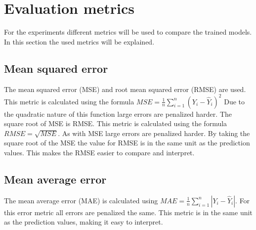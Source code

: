 \documentclass[class=scrbook, crop=false]{standalone}
\begin{document}




\section{Evaluation metrics}
\label{Section:Evaluation_Metrics}

For the experiments different metrics will be used to compare the trained models. 
In this section the used metrics will be explained.

\subsection{Mean squared error}

The mean squared error (MSE) and root mean squared error (RMSE) are used.
This metric is calculated using the formula $MSE = \frac{1}{n} \sum_{i=1}^{n}(Y_i - \hat{Y}_i)^2$
Due to the quadratic nature of this function large errors are penalized harder.
The square root of MSE is RMSE. 
This metric is calculated using the formula $RMSE = \sqrt{MSE}$.
As with MSE large errors are penalized harder.
By taking the square root of the MSE the value for RMSE is in the same unit as the prediction values. 
This makes the RMSE easier to compare and interpret.

\subsection{Mean average error}
The mean average error (MAE) is calculated using $MAE = \frac{1}{n} \sum_{i=1}^{n}|Y_i - \hat{Y}_i|$.
For this error metric all errors are penalized the same.
This metric is in the same unit as the prediction values, making it easy to interpret.
\end{document}

